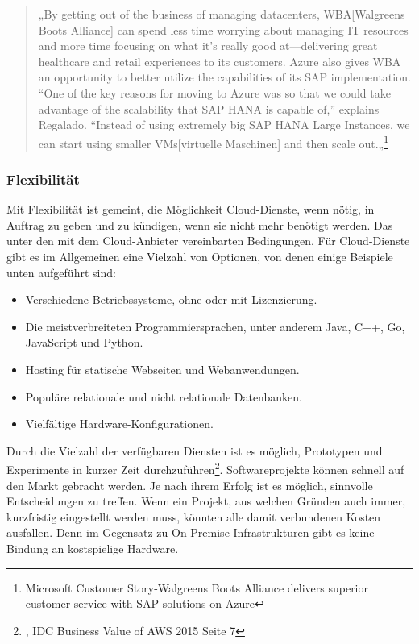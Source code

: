 \begin{quote}
      „By getting out of the business of managing datacenters, WBA[Walgreens Boots Alliance] can spend less time worrying about managing IT resources and more time focusing on what it’s really good at—delivering great healthcare and retail experiences to its customers. Azure also gives WBA an opportunity to better utilize the capabilities of its SAP implementation. “One of the key reasons for moving to Azure was so that we could take advantage of the scalability that SAP HANA is capable of,” explains Regalado. “Instead of using extremely big SAP HANA Large Instances, we can start using smaller VMs[virtuelle Maschinen] and then scale out.„\footnote{\cite{AZU01} Microsoft Customer Story-Walgreens Boots Alliance delivers superior customer
      service with SAP solutions on Azure}
\end{quote}

\subsubsection{Flexibilität}%
Mit Flexibilität ist gemeint, die Möglichkeit Cloud-Dienste, wenn nötig, in Auftrag zu geben und zu kündigen, wenn sie nicht mehr benötigt werden. Das unter den mit dem Cloud-Anbieter vereinbarten Bedingungen.
Für Cloud-Dienste gibt es im Allgemeinen eine Vielzahl von Optionen, von denen einige Beispiele unten aufgeführt sind:
\begin{itemize}
\item
    Verschiedene Betriebssysteme, ohne oder mit Lizenzierung.
\item
    Die meistverbreiteten Programmiersprachen, unter anderem Java, C++, Go, JavaScript und Python.{\cite{AMZ03}}
\item
    Hosting für statische Webseiten und Webanwendungen{\cite{AMZ04}}.
\item
    Populäre relationale und nicht relationale Datenbanken{\cite{AMZ10}}.           
\item
    Vielfältige Hardware-Konfigurationen.

\end{itemize}
\begin{flushleft}
Durch die Vielzahl der verfügbaren Diensten ist es möglich, Prototypen und Experimente in kurzer Zeit durchzuführen\footnote{\cite{IDC01}, IDC Business Value of AWS 2015 Seite 7}. Softwareprojekte können schnell auf den Markt gebracht werden. Je nach ihrem Erfolg ist es möglich, sinnvolle Entscheidungen zu treffen. Wenn ein Projekt, aus welchen Gründen auch immer, kurzfristig eingestellt werden muss, könnten alle damit verbundenen Kosten ausfallen. Denn im Gegensatz zu On-Premise-Infrastrukturen gibt es keine Bindung an kostspielige Hardware.
\end{flushleft}

